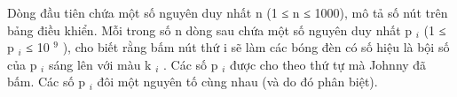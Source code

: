Dòng đầu tiên chứa một số nguyên duy nhất n (1 ≤ n ≤ 1000), mô tả số nút trên bảng điều khiển. Mỗi trong số n dòng sau chứa một số nguyên duy nhất p   $_    i   $   (1 ≤ p   $_    i   $   ≤ 10   $^    9   $   ), cho biết rằng bấm nút thứ i sẽ làm các bóng đèn có số hiệu là bội số của p   $_    i   $   sáng lên với màu k   $_    i   $   . Các số p   $_    i   $   được cho theo thứ tự mà Johnny đã bấm. Các số p   $_    i   $   đôi một nguyên tố cùng nhau (và do đó phân biệt).
